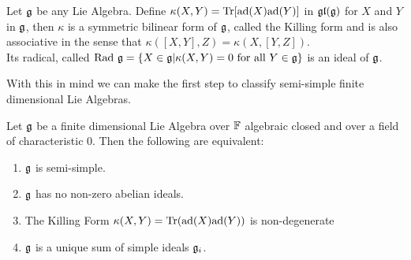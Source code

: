 \begin{defi}
	Let $\mathfrak{g}$ be any Lie Algebra. Define $\kappa(X,Y)= \text{Tr} [\text{ad}(X)\text{ad}(Y)]$ in $\mathfrak{gl}(\mathfrak{g})$ for $X$ and $Y$ in $\mathfrak{g}$, then $\kappa$ is a symmetric bilinear form of $\mathfrak{g}$, called the Killing form and is also associative in the sense that $\kappa([X,Y],Z)=\kappa(X,[Y,Z])$.\\
	Its radical, called $\text{Rad } \mathfrak{g} = \{X \in \mathfrak{g} | \kappa(X,Y)=0 \text{ for all } Y \in \mathfrak{g}\}$ is an ideal of $\mathfrak{g}$. 
	\label{Killing Form}
\end{defi}
With this in mind we can make the first step to classify semi-simple finite dimensional Lie Algebras.
\begin{teo}
	Let $\mathfrak{g}$ be a finite dimensional Lie Algebra over $\mathbb{F}$ algebraic closed and over a field of characteristic $0$. Then the following are equivalent:
	\begin{enumerate}
		\item $\mathfrak{g}$ is semi-simple.
		\item $\mathfrak{g}$ has no non-zero abelian ideals.
		\item The Killing Form $\kappa(X,Y)=\text{Tr}(\text{ad}(X)\text{ad}(Y))$ is non-degenerate
		\item $\mathfrak{g}$ is a unique sum of simple ideals $\mathfrak{g}_i$.
	\end{enumerate}
\end{teo}
